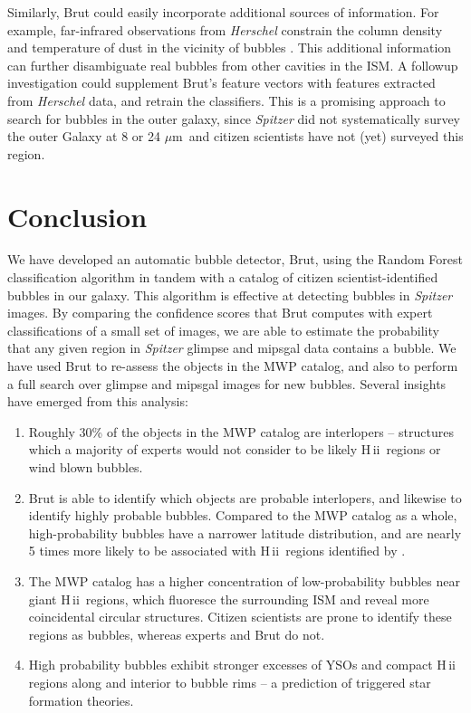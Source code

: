 \documentclass[preprint]{aastex}
\newcommand{\um}[0]{$\mu$m}
\newcommand{\hii}[0]{{\sc H\,ii}}
\begin{document}
Similarly, Brut could easily incorporate additional sources of information. For example, far-infrared observations from \emph{Herschel} constrain the column density and temperature of dust in the vicinity of bubbles \citep{Anderson12b}. This additional information can further disambiguate real bubbles from other cavities in the ISM. A followup investigation could supplement Brut's feature vectors with features extracted from \emph{Herschel} data, and retrain the classifiers. This is a promising approach to search for bubbles in the outer galaxy, since \emph{Spitzer} did not systematically survey the outer Galaxy at 8 or 24 \um\, and citizen scientists have not (yet) surveyed this region.


\section{Conclusion}
\label{sec:conclusion}
We have developed an automatic bubble detector, Brut, using the Random Forest classification algorithm in tandem with a catalog of citizen scientist-identified bubbles in our galaxy. This algorithm is effective at detecting bubbles in \emph{Spitzer} images. By comparing the confidence scores that Brut computes with expert classifications of a small set of images, we are able to estimate the probability that any given region in \emph{Spitzer} {\sc glimpse} and {\sc mipsgal} data contains a bubble. We have used Brut to re-assess the objects in the MWP catalog, and also to perform a full search over {\sc glimpse} and {\sc mipsgal} images for new bubbles.  Several insights have emerged from this analysis:
\begin{enumerate}
\item Roughly 30\% of the objects in the MWP catalog are interlopers -- structures which a majority of experts would not consider to be likely \hii\, regions or wind blown bubbles.
\item Brut is able to identify which objects are probable interlopers, and likewise to identify highly probable bubbles. Compared to the MWP catalog as a whole, high-probability bubbles have a narrower latitude distribution, and are nearly 5 times more likely to be associated with \hii\, regions identified by \cite{Anderson11}.
\item The MWP catalog has a higher concentration of low-probability bubbles near giant \hii\, regions, which fluoresce the surrounding ISM and reveal more coincidental circular structures. Citizen scientists are prone to identify these regions as bubbles, whereas experts and Brut do not.
\item High probability bubbles  exhibit stronger excesses of YSOs and compact \hii\, regions along and interior to bubble rims -- a prediction of triggered star formation theories.
\end{enumerate}
\end{document}
